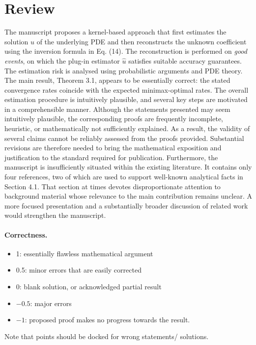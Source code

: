 \documentclass[11pt]{article}
\theoremstyle{remark}
\begin{document}
\maketitle

\section{Review}

The manuscript proposes a kernel-based approach that first estimates the solution $u$ of the underlying PDE and then reconstructs the unknown coefficient using the inversion formula in Eq. (14). The reconstruction is performed on \textit{good events}, on which the plug-in estimator $\hat{u}$ satisfies suitable accuracy guarantees. The estimation risk is analysed using probabilistic arguments and PDE theory.
The main result, Theorem 3.1, appears to be essentially correct: the stated convergence rates coincide with the expected minimax-optimal rates. The overall estimation procedure is intuitively plausible, and several key steps are motivated in a comprehensible manner. Although the statements presented may seem intuitively plausible, the corresponding proofs are frequently incomplete, heuristic, or mathematically not sufficiently explained. As a result, the validity of several claims cannot be reliably assessed from the proofs provided. Substantial revisions are therefore needed to bring the mathematical exposition and justification to the standard required for publication.
Furthermore, the manuscript is insufficiently situated within the existing literature. It contains only four references, two of which are used to support well-known analytical facts in Section 4.1. That section at times devotes disproportionate attention to background material whose relevance to the main contribution remains unclear. A more focused presentation and a substantially broader discussion of related work would strengthen the manuscript.


\paragraph{Correctness.}
\begin{itemize}
	\item  1: essentially flawless mathematical argument
	\item  0.5: minor errors that are easily corrected
	\item  0: blank solution, or acknowledged partial result
	\item  $-0.5$: major errors
	\item  $-1$: proposed proof makes no progress towards the result.
\end{itemize}
Note that points should be docked for wrong statements/ solutions.
\end{document}
